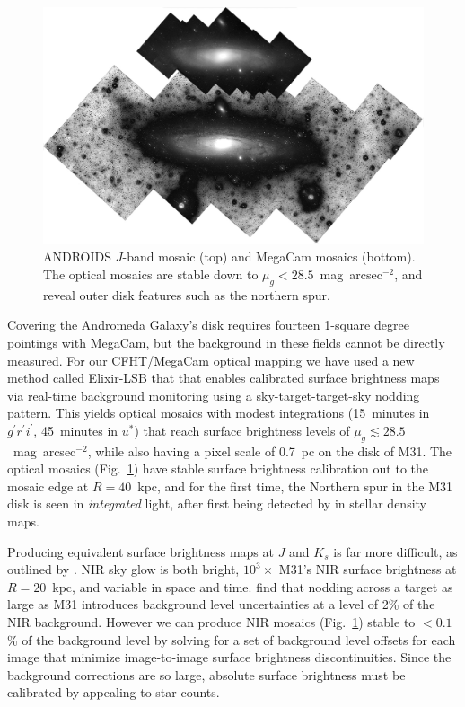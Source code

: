 \documentclass[11pt,twoside]{article}
\begin{document}
\begin{figure}[t]
\centering
\includegraphics[width=\columnwidth]{mosaics}
\caption{ANDROIDS $J$-band mosaic (top) and MegaCam mosaics (bottom). The optical mosaics are stable down to $\mu_g<28.5$~mag~arcsec$^{-2}$, and reveal outer disk features such as the northern spur.}
\label{fig:mosaics}
\end{figure}

Covering the Andromeda Galaxy's disk requires fourteen 1-square degree pointings with MegaCam, but the background in these fields cannot be directly measured.
For our CFHT/MegaCam optical mapping we have used a new method called Elixir-LSB that that enables calibrated surface brightness maps via real-time background monitoring  using a sky-target-target-sky nodding pattern.
This yields optical mosaics with modest integrations (15~minutes in $g^\prime r^\prime i^\prime$, 45~minutes in $u^*$) that reach surface brightness levels of $\mu_g \lesssim 28.5$~mag~arcsec$^{-2}$, while also having a pixel scale of 0.7~pc on the disk of M31.
The optical mosaics (Fig.~\ref{fig:mosaics}) have stable surface brightness calibration out to the mosaic edge at $R=40$~kpc, and for the first time, the Northern spur in the M31 disk is seen in \emph{integrated} light, after first being detected by \cite{Ferguson:2002} in stellar density maps.

Producing equivalent surface brightness maps at $J$ and $K_s$ is far more difficult, as outlined by \cite{Sick:2013}.
NIR sky glow is both bright, $10^3\times$ M31's NIR surface brightness at $R=20$~kpc, and variable in space and time.
\citeauthor{Sick:2013} find that nodding across a target as large as M31 introduces background level uncertainties at a level of 2\% of the NIR background.
However we can produce NIR mosaics (Fig.~\ref{fig:mosaics}) stable to $<0.1$\% of the background level by solving for a set of background level offsets for each image that minimize image-to-image surface brightness discontinuities.
Since the background corrections are so large, absolute surface brightness must be calibrated by appealing to star counts.
\end{document}
